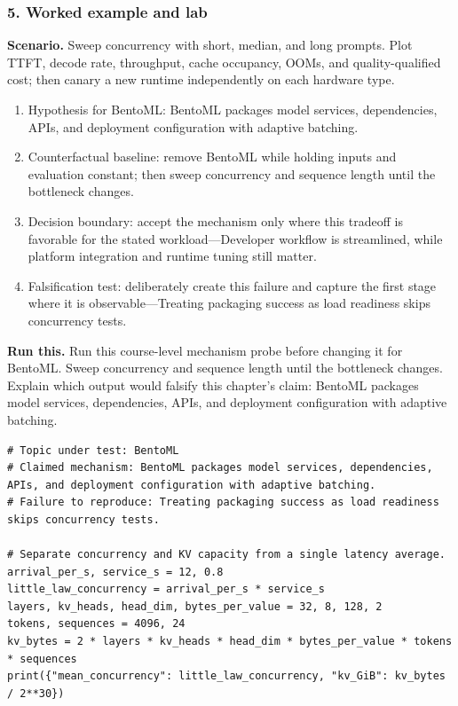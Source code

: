 \subsubsection*{5. Worked example and lab}
\textbf{Scenario.} Sweep concurrency with short, median, and long prompts. Plot TTFT, decode rate, throughput, cache occupancy, OOMs, and quality-qualified cost; then canary a new runtime independently on each hardware type.
\begin{enumerate}
\item Hypothesis for BentoML: BentoML packages model services, dependencies, APIs, and deployment configuration with adaptive batching.
\item Counterfactual baseline: remove BentoML while holding inputs and evaluation constant; then sweep concurrency and sequence length until the bottleneck changes.
\item Decision boundary: accept the mechanism only where this tradeoff is favorable for the stated workload—Developer workflow is streamlined, while platform integration and runtime tuning still matter.
\item Falsification test: deliberately create this failure and capture the first stage where it is observable—Treating packaging success as load readiness skips concurrency tests.
\end{enumerate}
\textbf{Run this.} Run this course-level mechanism probe before changing it for BentoML. Sweep concurrency and sequence length until the bottleneck changes. Explain which output would falsify this chapter's claim: BentoML packages model services, dependencies, APIs, and deployment configuration with adaptive batching.
\begin{Verbatim}[fontsize=\scriptsize]
# Topic under test: BentoML
# Claimed mechanism: BentoML packages model services, dependencies, APIs, and deployment configuration with adaptive batching.
# Failure to reproduce: Treating packaging success as load readiness skips concurrency tests.

# Separate concurrency and KV capacity from a single latency average.
arrival_per_s, service_s = 12, 0.8
little_law_concurrency = arrival_per_s * service_s
layers, kv_heads, head_dim, bytes_per_value = 32, 8, 128, 2
tokens, sequences = 4096, 24
kv_bytes = 2 * layers * kv_heads * head_dim * bytes_per_value * tokens * sequences
print({"mean_concurrency": little_law_concurrency, "kv_GiB": kv_bytes / 2**30})
\end{Verbatim}
